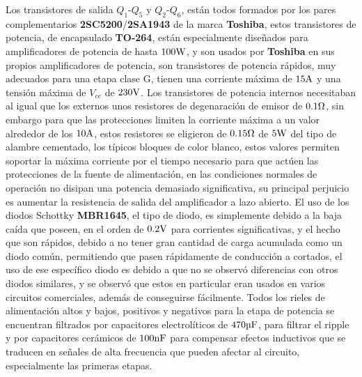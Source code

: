 Los transistores de salida $Q_{1}$-$Q_{5}$ y $Q_{2}$-$Q_{6}$, están todos formados por los pares complementarios \textbf{2SC5200}/\textbf{2SA1943} de la marca \textbf{Toshiba}, estos transistores de potencia, de encapsulado \textbf{TO-264}, están especialmente diseñados para amplificadores de potencia de hasta $100 \si[per-mode=symbol]{\watt}$, y son usados por \textbf{Toshiba} en sus propios amplificadores de potencia, son transistores de potencia rápidos, muy adecuados para una etapa clase G, tienen una corriente máxima de $15 \si[per-mode=symbol]{\ampere}$ y una tensión máxima de $V_{ce}$ de $230 \si[per-mode=symbol]{\volt}$. Los transistores de potencia internos necesitaban al igual que los externos unos resistores de degenaración de emisor de $0.1 \si[per-mode=symbol]{\ohm}$, sin embargo para que las protecciones limiten la corriente máxima a un valor alrededor de los $10 \si[per-mode=symbol]{\ampere}$, estos resistores se eligieron de $0.15 \si[per-mode=symbol]{\ohm}$ de $5 \si[per-mode=symbol]{\watt}$ del tipo de alambre cementado, los típicos bloques de color blanco, estos valores permiten soportar la máxima corriente por el tiempo necesario para que actúen las protecciones de la fuente de alimentación, en las condiciones normales de operación no disipan una potencia demasiado significativa, su principal perjuicio es aumentar la resistencia de salida del amplificador a lazo abierto.
El uso de los diodos Schottky \textbf{MBR1645}, el tipo de diodo, es simplemente debido a la baja caída que poseen, en el orden de $0.2 \si[per-mode=symbol]{\volt}$ para corrientes significativas, y el hecho que son rápidos, debido a no tener gran cantidad de carga acumulada como un diodo común, permitiendo que pasen rápidamente de conducción a cortados, el uso de ese específico diodo es debido a que no se observó diferencias con otros diodos similares, y se observó que estos en particular eran usados en varios circuitos comerciales, además de conseguirse fácilmente. Todos los rieles de alimentación altos y bajos, positivos y negativos para la etapa de potencia se encuentran filtrados por capacitores electrolíticos de $470 \si[per-mode=symbol]{\micro\farad}$, para filtrar el ripple y por capacitores cerámicos de $100 \si[per-mode=symbol]{\nano\farad}$ para compensar efectos inductivos que se traducen en señales de alta frecuencia que pueden afectar al circuito, especialmente las primeras etapas.




